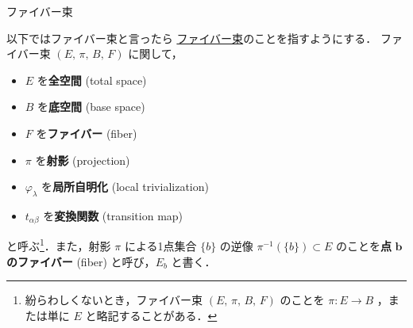 \documentclass[TQFT_main]{subfiles}
\begin{document}
\begin{mydef}[label=def.fiber-1,breakable]{\cinfty ファイバー束}
\end{mydef}

以下ではファイバー束と言ったら \hyperref[def.fiber-1]{\cinfty ファイバー束}のことを指すようにする．
ファイバー束 $(E,\, \pi ,\, B,\, F)$ に関して，
\begin{itemize}
	\item $E$ を\textbf{全空間} (total space)
	\item $B$ を\textbf{底空間} (base space)
	\item $F$ を\textbf{ファイバー} (fiber)
	\item $\pi$ を\textbf{射影} (projection)
	\item $\varphi_\lambda$ を\textbf{局所自明化} (local trivialization)
	\item $t_{\alpha\beta}$ を\textbf{変換関数} (transition map)
\end{itemize}
と呼ぶ\footnote{紛らわしくないとき，ファイバー束 $(E,\, \pi,\, B,\, F)$ のことを $\pi \colon E \to B$ ，または単に $E$ と略記することがある．}．また，射影 $\pi$ による1点集合 $\{b\}$ の逆像 $\pi^{-1}(\{b\}) \subset E$ のことを\textbf{点} $\bm{b}$ \textbf{のファイバー} (fiber) と呼び，$E_b$ と書く．\label{def:point-fiber}
\end{document}
